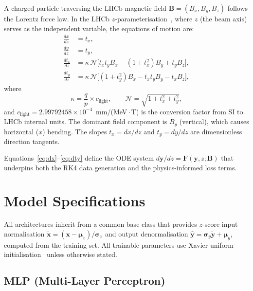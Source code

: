 \documentclass[a4paper,11pt]{article}
\newcommand{\Bfield}{\mathbf{B}}
\newcommand{\state}{\mathbf{y}}
\begin{document}
A charged particle traversing the LHCb magnetic field $\Bfield =
(B_x, B_y, B_z)$ follows the Lorentz force law.  In the LHCb
$z$-parameterisation~\cite{RK4_extrapolator}, where $z$ (the beam axis)
serves as the independent variable, the equations of motion are:
\begin{align}
  \frac{dx}{dz}   &= t_x, \label{eq:dx} \\
  \frac{dy}{dz}   &= t_y, \label{eq:dy} \\
  \frac{dt_x}{dz} &= \kappa \, \mathcal{N}
    \bigl[ t_x t_y B_x - (1 + t_x^2) B_y + t_y B_z \bigr],
    \label{eq:dtx} \\
  \frac{dt_y}{dz} &= \kappa \, \mathcal{N}
    \bigl[ (1 + t_y^2) B_x - t_x t_y B_y - t_x B_z \bigr],
    \label{eq:dty}
\end{align}
where
\begin{equation}
  \kappa = \frac{q}{p} \times c_\text{light},
  \qquad
  \mathcal{N} = \sqrt{1 + t_x^2 + t_y^2},
  \label{eq:kappa}
\end{equation}
and $c_\text{light} = 2.99792458 \times 10^{-4}$~mm/(MeV\,$\cdot$\,T)
is the conversion factor from SI to LHCb internal units.  The dominant
field component is $B_y$ (vertical), which causes horizontal ($x$)
bending.  The slopes $t_x = dx/dz$ and $t_y = dy/dz$ are dimensionless
direction tangents.

Equations~\eqref{eq:dx}--\eqref{eq:dty} define the ODE system
$d\state/dz = \mathbf{F}(\state, z; \Bfield)$ that underpins both the
RK4 data generation and the physics-informed loss terms.

\section{Model Specifications}
\label{sec:models}

All architectures inherit from a common base class that provides
$z$-score input normalisation
$\tilde{\mathbf{x}} = (\mathbf{x} - \bm{\mu}_x) / \bm{\sigma}_x$
and output denormalisation
$\hat{\mathbf{y}} = \bm{\sigma}_y \tilde{\mathbf{y}} + \bm{\mu}_y$,
computed from the training set.  All trainable parameters use Xavier
uniform initialisation~\cite{Glorot2010} unless otherwise stated.

\subsection{MLP (Multi-Layer Perceptron)}
\label{sec:mlp}
\end{document}
